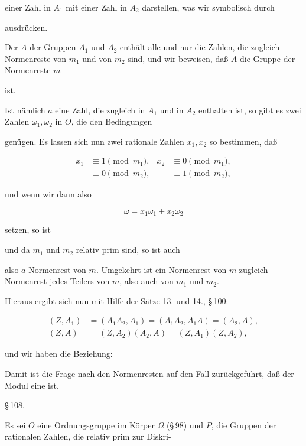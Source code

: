 einer Zahl in $A_1$ mit einer Zahl in $A_2$ darstellen, was wir symbolisch durch


ausdrücken.

Der  $A$ der Gruppen $A_1$ und $A_2$ enthält alle und nur die Zahlen, die zugleich Normenreste von $m_1$ und von $m_2$ sind, und wir beweisen, daß $A$ die Gruppe der Normenreste $m$


ist.

Ist nämlich $a$ eine Zahl, die zugleich in $A_1$ und in $A_2$ enthalten ist, so gibt es zwei Zahlen $\omega_1, \omega_2$ in $O$, die den Bedingungen


genügen. Es lassen sich nun zwei rationale Zahlen $x_1, x_2$ so bestimmen, daß

\[
\begin{aligned}
x_1 &\equiv 1 \pmod{m_1}, & x_2 &\equiv 0 \pmod{m_1},\\
&\equiv 0 \pmod{m_2}, & &\equiv 1 \pmod{m_2},
\end{aligned}
\]

und wenn wir dann also

\[ \omega = x_1 \omega_1 + x_2 \omega_2 \]

setzen, so ist


und da $m_1$ und $m_2$ relativ prim sind, so ist auch


also $a$ Normenrest von $m$. Umgekehrt ist ein Normenrest von $m$ zugleich Normenrest jedes Teilers von $m$, also auch von $m_1$ und $m_2$.

Hieraus ergibt sich nun mit Hilfe der Sätze 13. und 14., \S\,100:

\[
\begin{aligned}
(Z, A_1) &= (A_1 A_2, A_1) = (A_1 A_2, A_1 A) = (A_2, A),\\
(Z, A) &= (Z, A_2)(A_2, A) = (Z, A_1)(Z, A_2),
\end{aligned}
\]

und wir haben die Beziehung:


Damit ist die Frage nach den Normenresten auf den Fall zurückgeführt, daß der Modul eine  ist.

\S\,108. 

Es sei $O$ eine Ordnungsgruppe im Körper $\Omega$ (\S\,98) und $P$, die Gruppen der rationalen Zahlen, die relativ prim zur Diskri-
